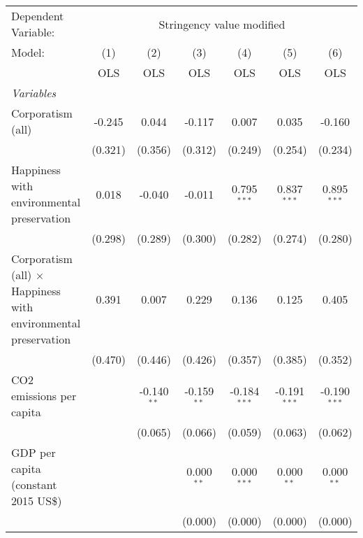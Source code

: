 
\begingroup
\centering
\begin{tabular}{lcccccc}
   \toprule
   Dependent Variable: & \multicolumn{6}{c}{Stringency value modified}\\
   Model:                                                                & (1)     & (2)           & (3)           & (4)            & (5)            & (6)\\  
                                                                         &  OLS    & OLS           & OLS           & OLS            & OLS            & OLS\\  
   \midrule
   \emph{Variables}\\
   Corporatism (all)                                                     & -0.245  & 0.044         & -0.117        & 0.007          & 0.035          & -0.160\\   
                                                                         & (0.321) & (0.356)       & (0.312)       & (0.249)        & (0.254)        & (0.234)\\   
   Happiness with environmental preservation                             & 0.018   & -0.040        & -0.011        & 0.795$^{***}$  & 0.837$^{***}$  & 0.895$^{***}$\\   
                                                                         & (0.298) & (0.289)       & (0.300)       & (0.282)        & (0.274)        & (0.280)\\   
   Corporatism (all) $\times$ Happiness with environmental preservation  & 0.391   & 0.007         & 0.229         & 0.136          & 0.125          & 0.405\\   
                                                                         & (0.470) & (0.446)       & (0.426)       & (0.357)        & (0.385)        & (0.352)\\   
   CO2 emissions per capita                                              &         & -0.140$^{**}$ & -0.159$^{**}$ & -0.184$^{***}$ & -0.191$^{***}$ & -0.190$^{***}$\\   
                                                                         &         & (0.065)       & (0.066)       & (0.059)        & (0.063)        & (0.062)\\   
   GDP per capita (constant 2015 US\$)                                   &         &               & 0.000$^{**}$  & 0.000$^{***}$  & 0.000$^{**}$   & 0.000$^{**}$\\   
                                                                         &         &               & (0.000)       & (0.000)        & (0.000)        & (0.000)\\   

\end{tabular}
